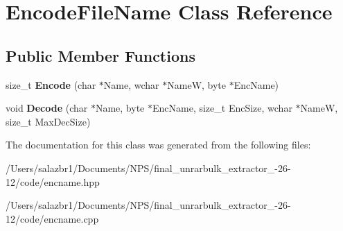 \hypertarget{class_encode_file_name}{\section{Encode\-File\-Name Class Reference}
\label{class_encode_file_name}
}
\subsection*{Public Member Functions}
\begin{DoxyCompactItemize}
\item 
\hypertarget{class_encode_file_name_a7b8d0b197bd1e947f7a81f5a06155e5a}{size\-\_\-t {\bfseries Encode} (char $\ast$Name, wchar $\ast$Name\-W, byte $\ast$Enc\-Name)}\label{class_encode_file_name_a7b8d0b197bd1e947f7a81f5a06155e5a}

\item 
\hypertarget{class_encode_file_name_a87e52ed229f07719dd9d78e09c10cf5c}{void {\bfseries Decode} (char $\ast$Name, byte $\ast$Enc\-Name, size\-\_\-t Enc\-Size, wchar $\ast$Name\-W, size\-\_\-t Max\-Dec\-Size)}\label{class_encode_file_name_a87e52ed229f07719dd9d78e09c10cf5c}

\end{DoxyCompactItemize}


The documentation for this class was generated from the following files\-:\begin{DoxyCompactItemize}
\item 
/\-Users/salazbr1/\-Documents/\-N\-P\-S/final\-\_\-unrarbulk\-\_\-extractor\-\_-\/26-\/12/code/encname.\-hpp\item 
/\-Users/salazbr1/\-Documents/\-N\-P\-S/final\-\_\-unrarbulk\-\_\-extractor\-\_-\/26-\/12/code/encname.\-cpp\end{DoxyCompactItemize}
